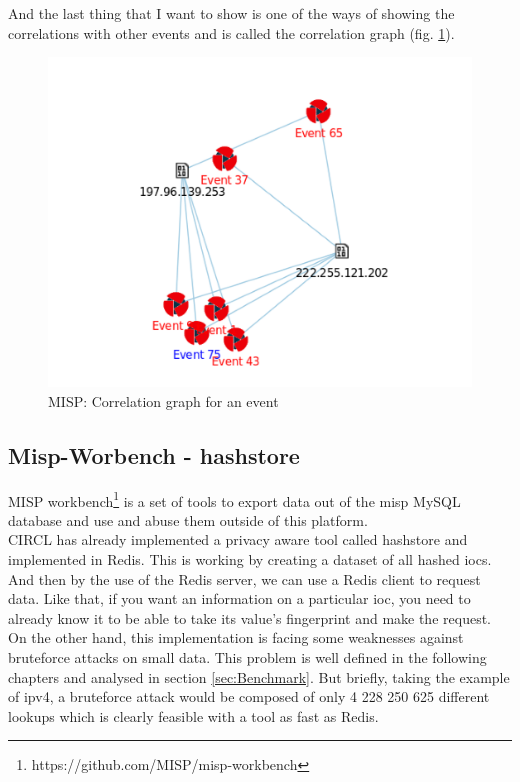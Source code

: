 \documentclass{eplmastersthesis}
\begin{document}
And the last thing that I want to show is one of the ways of showing the correlations with other events and is called the correlation graph (fig. \ref{webcorrelation}).
\begin{figure}[!h]
	\begin{center}
		\includegraphics[scale=0.35]{res/webCorrelationGraph}
		\caption{MISP: Correlation graph for an event}
		\label{webcorrelation}
	\end{center}
\end{figure}


\subsection{Misp-Worbench - hashstore}

MISP workbench\footnote{https://github.com/MISP/misp-workbench} is a set of tools to export data out of the \gls{misp} MySQL database and use and abuse them outside of this platform.\\

CIRCL has already implemented a privacy aware tool called hashstore and implemented in Redis. This is working by creating a dataset of all hashed \glspl{ioc}. And then by the use of the Redis server, we can use a Redis client to request data.
Like that, if you want an information on a particular \gls{ioc}, you need to already know it to be able to take its value's fingerprint and make the request.\\

On the other hand, this implementation is facing some weaknesses against bruteforce attacks on small data. This problem is well defined in the following chapters and analysed in section \ref{sec:Benchmark}. But briefly, taking the example of \gls{ipv4}, a bruteforce attack would be composed of only 4 228 250 625 different lookups which is clearly feasible with a tool as fast as Redis.
\end{document}
